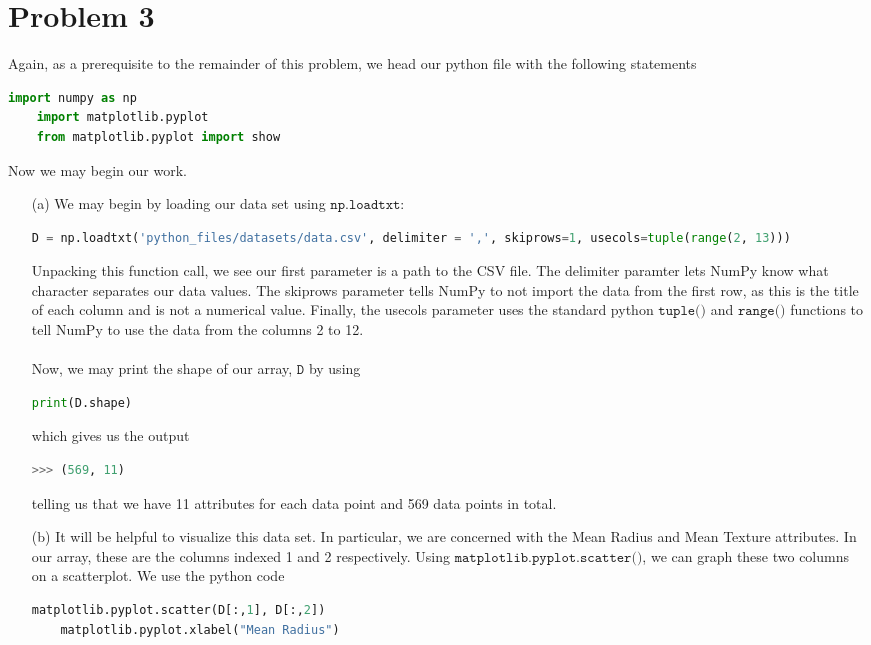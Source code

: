 \documentclass[12pt, letterpaper]{article}
\begin{document}
\section*{Problem 3}
Again, as a prerequisite to the remainder of this problem, we head our python 
file with the following statements
\begin{lstlisting}[language=python]
    import numpy as np
    import matplotlib.pyplot
    from matplotlib.pyplot import show
\end{lstlisting}
Now we may begin our work.
\begin{enumerate}
    \item [(a)] We may begin by loading our data set using $\texttt{np.loadtxt}$:
\begin{lstlisting}[language=python]
    D = np.loadtxt('python_files/datasets/data.csv', delimiter = ',', skiprows=1, usecols=tuple(range(2, 13)))
\end{lstlisting}
    Unpacking this function call, we see our first parameter is a path to the CSV file. The 
    delimiter paramter lets NumPy know what character separates our data values. The skiprows 
    parameter tells NumPy to not import the data from the first row, as this is the title of each column 
    and is not a numerical value. Finally, the usecols parameter uses the standard python 
    $\texttt{tuple()}$ and $\texttt{range()}$ functions to tell NumPy to use the data from the 
    columns 2 to 12. \\ \\
    Now, we may print the shape of our array, $\texttt{D}$ by using 
\begin{lstlisting}[language=python]
    print(D.shape)
\end{lstlisting}
    which gives us the output 
\begin{lstlisting}[language=python]
    >>> (569, 11)
\end{lstlisting}
    telling us that we have 11 attributes for each data point and 569 data points in total. 
    \item [(b)] It will be helpful to visualize this data set. In particular, we are 
        concerned with the Mean Radius and Mean Texture attributes. In our array, these are
        the columns indexed 1 and 2 respectively. Using $\texttt{matplotlib.pyplot.scatter()}$, we 
        can graph these two columns on a scatterplot. We use the python code 
\begin{lstlisting}[language=python]
    matplotlib.pyplot.scatter(D[:,1], D[:,2])
    matplotlib.pyplot.xlabel("Mean Radius")

\end{lstlisting}
\end{enumerate}
\end{document}

